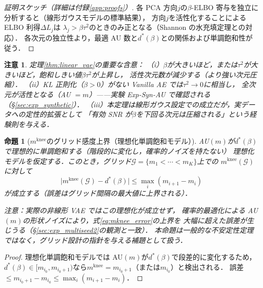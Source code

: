 \documentclass[11pt,a4paper]{jsarticle}
\newtheorem{proposition}{命題}
\newtheorem{remark}{注意}
\newcommand{\mknee}{m^{\mathrm{knee}}}
\begin{document}
\begin{proof}[証明スケッチ（詳細は付録\ref{app:proofs}）]
各 PCA 方向$j$の$\beta$-ELBO 寄与を独立に分析すると（線形ガウスモデルの標準結果），
方向$j$を活性化することによる ELBO 利得$\Delta L_j$は
$\lambda_j > \beta\tau^2$のときのみ正となる（Shannon の水充填定理との対応）．
各次元の独立性より，最適 AU 数と$d^*(\beta)$との関係および単調飽和性が従う．
\end{proof}

\begin{remark}
定理\ref{thm:linear_vae}の重要な含意：
（i）$\beta$が大きいほど，または$\tau^2$が大きいほど，飽和しきい値$\beta\tau^2$が上昇し，
活性次元数が減少する（より強い次元圧縮）．
（ii）KL 正則化（$\beta > 0$）がない Vanilla AE では$\tau^2 \to 0$に相当し，
全次元が活性となる（AU $= m$）——実験 Exp-Syn-AU で確認される（§\ref{sec:exp_synthetic}）．
（iii）本定理は線形ガウス設定での成立だが，実データへの定性的拡張として
「有効 SNR が$\beta$を下回る次元は圧縮される」という経験則を与える．
\end{remark}

\begin{proposition}[$\mknee$のグリッド感度上界（理想化単調飽和モデル）]\label{thm:mknee_instab}
AU$(m)$が$d^*(\beta)$で理想的に単調飽和する（階段的に変化し，確率的ノイズを持たない）
理想化モデルを仮定する．このとき，グリッド$\mathcal{G} = \{m_1 < \cdots < m_K\}$上での
$\mknee(\mathcal{G})$に対して
\begin{equation}
  \bigl|\mknee(\mathcal{G}) - d^*(\beta)\bigr|
  \leq \max_{i} (m_{i+1} - m_i)
  \label{eq:mknee_error}
\end{equation}
が成立する（誤差はグリッド間隔の最大値に上界される）．

\noindent\textit{注意：実際の非線形 VAE ではこの理想化が成立せず，
確率的最適化による AU$(m)$の形状ノイズにより，式\eqref{eq:mknee_error}の上界を
大幅に超えた誤差が生じうる（§\ref{sec:exp_multiseed2}の観測と一致）．
本命題は一般的な不安定性定理ではなく，グリッド設計の指針を与える補題として扱う．}
\end{proposition}

\begin{proof}
理想化単調飽和モデルでは AU$(m)$が$d^*(\beta)$で段差的に変化するため，
$d^*(\beta) \in [m_{i_0}, m_{i_0+1})$なら$\mknee = m_{i_0+1}$（または$m_{i_0}$）と検出される．
誤差$\leq m_{i_0+1} - m_{i_0} \leq \max_i(m_{i+1}-m_i)$．
\end{proof}
\end{document}
